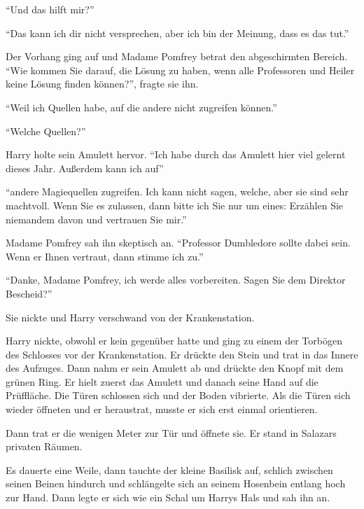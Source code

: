 \enquote{Und das hilft mir?}

\enquote{Das kann ich dir nicht versprechen, aber ich bin der Meinung, dass es das tut.}

Der Vorhang ging auf und Madame Pomfrey betrat den abgeschirmten Bereich. \enquote{Wie kommen Sie darauf, die Lösung zu haben, wenn alle Professoren und Heiler keine Lösung finden können?}, fragte sie ihn.

\enquote{Weil ich Quellen habe, auf die andere nicht zugreifen können.}

\enquote{Welche Quellen?}

Harry holte sein Amulett hervor. \enquote{Ich habe durch das Amulett hier viel gelernt dieses Jahr. Außerdem kann ich auf}


\enquote{andere Magiequellen zugreifen. Ich kann nicht sagen, welche, aber sie sind sehr machtvoll. Wenn Sie es zulassen, dann bitte ich Sie nur um eines: Erzählen Sie niemandem davon und vertrauen Sie mir.}

Madame Pomfrey sah ihn skeptisch an. \enquote{Professor Dumbledore sollte dabei sein. Wenn er Ihnen vertraut, dann stimme ich zu.}

\enquote{Danke, Madame Pomfrey, ich werde alles vorbereiten. Sagen Sie dem Direktor Bescheid?}

Sie nickte und Harry verschwand von der Krankenstation.


Harry nickte, obwohl er kein gegenüber hatte und ging zu einem der Torbögen des Schlosses vor der Krankenstation. Er drückte den Stein und trat in das Innere des Aufzuges. Dann nahm er sein Amulett ab und drückte den Knopf mit dem grünen Ring. Er hielt zuerst das Amulett und danach seine Hand auf die Prüffläche. Die Türen schlossen sich und der Boden vibrierte. Als die Türen sich wieder öffneten und er heraustrat, musste er sich erst einmal orientieren.

Dann trat er die wenigen Meter zur Tür und öffnete sie. Er stand in Salazars privaten Räumen.


Es dauerte eine Weile, dann tauchte der kleine Basilisk auf, schlich zwischen seinen Beinen hindurch und schlängelte sich an seinem Hosenbein entlang hoch zur Hand. Dann legte er sich wie ein Schal um Harrys Hals und sah ihn an.

